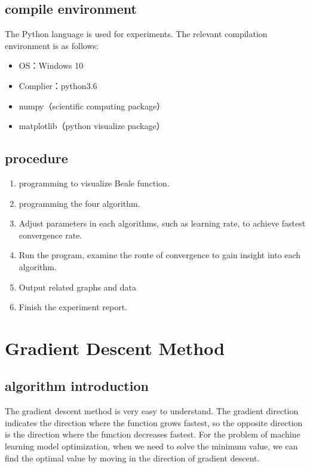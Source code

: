 \documentclass[aps,letterpaper,10pt]{article}
\begin{document}
\subsection{compile environment}
The Python language is used for experiments. The relevant compilation environment is as follows:
	\begin{itemize}
		\item OS：Windows 10
		\item Complier：python3.6
		\item numpy（scientific computing package）
		\item matplotlib（python visualize package）
	\end{itemize}

\subsection{procedure}

	\begin{enumerate}
		\item programming to visualize Beale function.
		\item programming the four algorithm.
		\item Adjust parameters in each algorithms, such as learning rate, to achieve fastest convergence rate.
		\item Run the program, examine the route of convergence to gain insight into each algorithm.
		\item Output related graphs and data
		\item Finish the experiment report.
	\end{enumerate}


\newpage
\section{Gradient Descent Method}
\subsection{algorithm introduction}
The gradient descent method is very easy to understand. The gradient direction indicates the direction where the function grows fastest, so the opposite direction is the direction where the function decreases fastest. For the problem of machine learning model optimization, when we need to solve the minimum value, we can find the optimal value by moving in the direction of gradient descent.\vspace{3mm}
\end{document}
